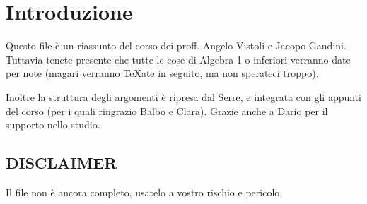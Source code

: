 \section*{Introduzione}
  Questo file è un riassunto del corso dei proff. Angelo Vistoli e Jacopo Gandini. Tuttavia tenete presente che tutte le cose di Algebra 1 o inferiori verranno date per note (magari verranno \TeX ate in seguito, ma non sperateci troppo).
  
  Inoltre la struttura degli argomenti è ripresa dal Serre, e integrata con gli appunti del corso (per i quali ringrazio Balbo e Clara).
	Grazie anche a Dario per il supporto nello studio.
  \subsection*{DISCLAIMER}
    Il file non è ancora completo, usatelo a vostro rischio e pericolo.
